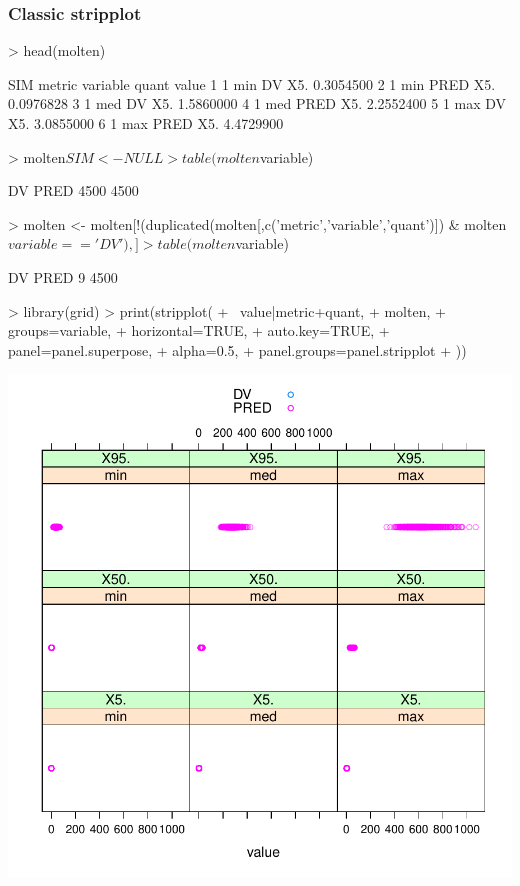 \subsubsection{Classic stripplot}
\begin{Schunk}
\begin{Sinput}
> head(molten)
\end{Sinput}
\begin{Soutput}
  SIM metric variable quant     value
1   1    min       DV   X5. 0.3054500
2   1    min     PRED   X5. 0.0976828
3   1    med       DV   X5. 1.5860000
4   1    med     PRED   X5. 2.2552400
5   1    max       DV   X5. 3.0855000
6   1    max     PRED   X5. 4.4729900
\end{Soutput}
\begin{Sinput}
> molten$SIM <- NULL
> table(molten$variable)
\end{Sinput}
\begin{Soutput}
  DV PRED 
4500 4500 
\end{Soutput}
\begin{Sinput}
> molten <- molten[!(duplicated(molten[,c('metric','variable','quant')]) & molten$variable=='DV'),]
> table(molten$variable)
\end{Sinput}
\begin{Soutput}
  DV PRED 
   9 4500 
\end{Soutput}
\begin{Sinput}
> library(grid)
> print(stripplot(
+ 	~value|metric+quant,
+ 	molten,
+ 	groups=variable,
+ 	horizontal=TRUE,
+ 	auto.key=TRUE,
+ 	panel=panel.superpose,
+ 	alpha=0.5,
+ 	panel.groups=panel.stripplot
+ ))
\end{Sinput}
\end{Schunk}
\includegraphics{model-stripplot}

